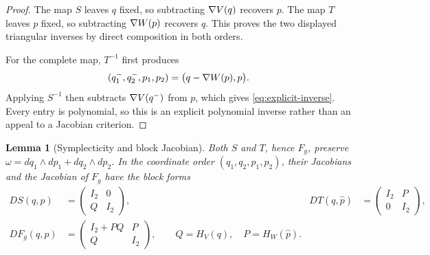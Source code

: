 \documentclass[11pt]{article}
\newtheorem{lemma}[theorem]{Lemma}
\theoremstyle{remark}
\numberwithin{equation}{section}
\begin{document}
\begin{proof}
The map \(S\) leaves \(q\) fixed, so subtracting
\(\nabla V(q)\) recovers \(p\).  The map \(T\) leaves \(p\) fixed, so
subtracting \(\nabla W(p)\) recovers \(q\).  This proves the two displayed
triangular inverses by direct composition in both orders.

For the complete map, \(T^{-1}\) first produces
\[
 (q_1^-,q_2^-,p_1,p_2)
 =
 \bigl(q-\nabla W(p),p\bigr).
\]
Applying \(S^{-1}\) then subtracts \(\nabla V(q^-)\) from \(p\), which gives
\eqref{eq:explicit-inverse}.  Every entry is polynomial, so this is an
explicit polynomial inverse rather than an appeal to a Jacobian criterion.
\end{proof}

\begin{lemma}[Symplecticity and block Jacobian]\label{lem:symplectic}
Both \(S\) and \(T\), hence \(F_g\), preserve
\(\omega=dq_1\wedge dp_1+dq_2\wedge dp_2\).  In the coordinate order
\((q_1,q_2,p_1,p_2)\), their Jacobians and the Jacobian of \(F_g\) have the
block forms
\begin{align}
 DS(q,p)
 &=\begin{pmatrix}I_2&0\\ Q&I_2\end{pmatrix},
&
 DT(q,\widehat p)
 &=\begin{pmatrix}I_2&P\\0&I_2\end{pmatrix},
 \label{eq:shear-block-jacobians}\\
 DF_g(q,p)
 &=\begin{pmatrix}I_2+PQ&P\\Q&I_2\end{pmatrix},
 \qquad
 Q=H_V(q),\quad P=H_W(\widehat p).
 \label{eq:complete-block-jacobian}
\end{align}
\end{lemma}
\end{document}
